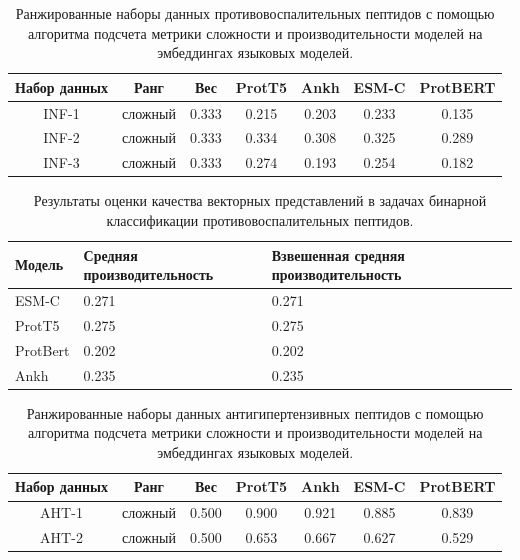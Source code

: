 \documentclass[specification,annotation,times]{itmo-student-thesis}
\begin{document}
\begin{table}[h]
\centering
\caption{Ранжированные наборы данных противовоспалительных пептидов с помощью алгоритма подсчета метрики сложности и производительности моделей на эмбеддингах языковых моделей.}
\label{tab:model_performance_inf}

\begin{tabular}{|c|c|c|c|c|c|c|}
\hline
Набор данных & Ранг & Вес & ProtT5 & Ankh & ESM-C & ProtBERT \\
\hline
INF-1 & сложный & 0.333 & 0.215 & 0.203 & 0.233 & 0.135 \\ \hline
INF-2 & сложный & 0.333 & 0.334 & 0.308 & 0.325 & 0.289 \\ \hline
INF-3 & сложный & 0.333 & 0.274 & 0.193 & 0.254 & 0.182 \\ \hline
\end{tabular}

\end{table}


\begin{table}[h]
\centering

\caption{Результаты оценки качества векторных представлений в задачах бинарной классификации противовоспалительных пептидов.}
\label{tab:compare_results_inf}
\begin{tabular}{|p{3cm}|p{5cm}|p{5cm}|}
\hline
Модель & Средняя \newline производительность & Взвешенная \newline средняя \newline производительность \\
\hline
ESM-C & 0.271 & 0.271 \\ \hline
ProtT5 & 0.275 & 0.275 \\ \hline
ProtBert & 0.202 & 0.202 \\ \hline
Ankh & 0.235 & 0.235 \\ \hline
\end{tabular}

\end{table}

\begin{table}[h]
\centering
\caption{Ранжированные наборы данных антигипертензивных пептидов с помощью алгоритма подсчета метрики сложности и производительности моделей на эмбеддингах языковых моделей.}
\label{tab:model_performance_aht}

\begin{tabular}{|c|c|c|c|c|c|c|}
\hline
Набор данных & Ранг & Вес & ProtT5 & Ankh & ESM-C & ProtBERT \\
\hline
AHT-1 & сложный & 0.500 & 0.900 & 0.921 & 0.885 & 0.839 \\ \hline
AHT-2 & сложный & 0.500 & 0.653 & 0.667 & 0.627 & 0.529 \\ \hline
\end{tabular}

\end{table}
\end{document}
